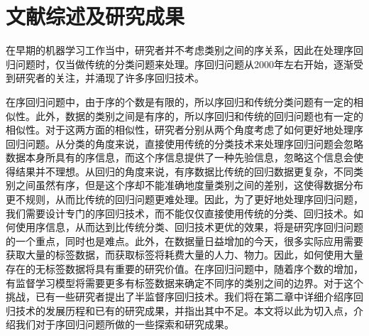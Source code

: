 
\section{文献综述及研究成果}
在早期的机器学习工作当中，研究者并不考虑类别之间的序关系，因此在处理序回归问题时，仅当做传统的分类问题来处理。序回归问题从2000年左右开始，逐渐受到研究者的关注，并涌现了许多序回归技术\citep{frank2001simple}\citep{herbrich1999support}\citep{shashua2002ranking}\citep{chu2005new}\citep{sun2010kernel}\citep{chu2005gaussian}\citep{cheng2008neural}。


在序回归问题中，由于序的个数是有限的，所以序回归和传统分类问题有一定的相似性。此外，数据的类别之间是有序的，所以序回归和传统的回归问题也有一定的相似性。对于这两方面的相似性，研究者分别从两个角度考虑了如何更好地处理序回归问题。从分类的角度来说，直接使用传统的分类技术来处理序回归问题会忽略数据本身所具有的序信息，而这个序信息提供了一种先验信息，忽略这个信息会使得结果并不理想。从回归的角度来说，有序数据比传统的回归数据更复杂，不同类别之间虽然有序，但是这个序却不能准确地度量类别之间的差别，这使得数据分布更不规则，从而比传统的回归问题更难处理。因此，为了更好地处理序回归问题，我们需要设计专门的序回归技术，而不能仅仅直接使用传统的分类、回归技术。如何使用序信息，从而达到比传统分类、回归技术更优的效果，将是研究序回归问题的一个重点，同时也是难点。此外，在数据量日益增加的今天，很多实际应用需要获取大量的标签数据，而获取标签将耗费大量的人力、物力。因此，如何使用大量存在的无标签数据将具有重要的研究价值。在序回归问题中，随着序个数的增加，有监督学习模型将需要更多有标签数据来确定不同序的类别之间的边界。对于这个挑战，已有一些研究者提出了半监督序回归技术。我们将在第二章中详细介绍序回归技术的发展历程和已有的研究成果，并指出其中不足。本文将以此为切入点，介绍我们对于序回归问题所做的一些探索和研究成果。

